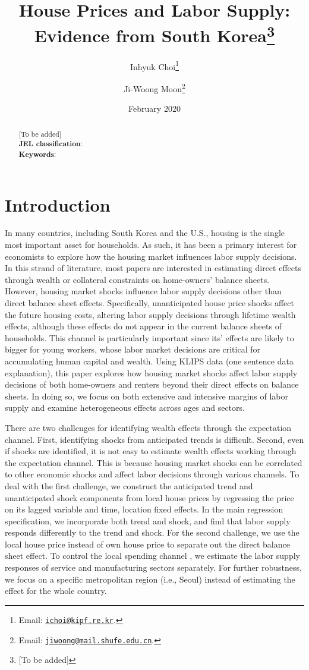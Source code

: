 \documentclass[10pt]{article}
\title{House Prices and Labor Supply: Evidence from South Korea\thanks{[To be added]}}
\author{
    Inhyuk Choi\thanks{Email: \texttt{\href{mailto:ichoi@kipf.re.kr}{ichoi@kipf.re.kr}}.}
    \and
    Ji-Woong Moon\thanks{Email: \texttt{\href{mailto:jiwoong@mail.shufe.edu.cn}{jiwoong@mail.shufe.edu.cn}}.}
    }
\date{February 2020}
\theoremstyle{definition}
\theoremstyle{remark}
\begin{document}
\maketitle

\begin{abstract}
    [To be added] \\
    \textbf{JEL classification}: \\
    \textbf{Keywords}: 
\end{abstract}

\newpage

\section{Introduction}\label{sec:intro}
In many countries, including South Korea and the U.S., housing is the single most important asset for households. As such, it has been a primary interest for economists to explore how the housing market influences labor supply decisions. In this strand of literature, most papers are interested in estimating direct effects through wealth or collateral constraints on home-owners' balance sheets. However, housing market shocks influence labor supply decisions other than direct balance sheet effects. Specifically, unanticipated house price shocks affect the future housing costs, altering labor supply decisions through lifetime wealth effects, although these effects do not appear in the current balance sheets of households. This channel is particularly important since its' effects are likely to bigger for young workers, whose labor market decisions are critical for accumulating human capital and wealth. Using KLIPS data (one sentence data explanation), this paper explores how housing market shocks affect labor supply decisions of both home-owners and renters beyond their direct effects on balance sheets. In doing so, we focus on both extensive and intensive margins of labor supply and examine heterogeneous effects across ages and sectors. 

There are two challenges for identifying wealth effects through the expectation channel. First, identifying shocks from anticipated trends is difficult. Second, even if shocks are identified, it is not easy to estimate wealth effects working through the expectation channel. This is because housing market shocks can be correlated to other economic shocks and affect labor decisions through various channels. To deal with the first challenge, we construct the anticipated trend and unanticipated shock components from local house prices by regressing the price on its lagged variable and time, location fixed effects. In the main regression specification, we incorporate both trend and shock, and find that labor supply responds differently to the trend and shock. For the second challenge, we use the local house price instead of own house price to separate out the direct balance sheet effect. To control the local spending channel \citep{ms2014}, we estimate the labor supply responses of service and manufacturing sectors separately. For further robustness, we focus on a specific metropolitan region (i.e., Seoul) instead of estimating the effect for the whole country.
\end{document}
